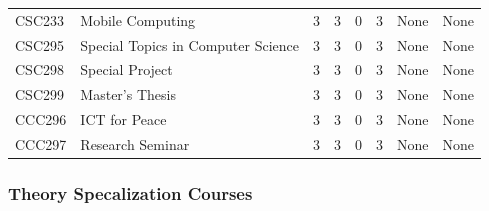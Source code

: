 \documentclass[11pt,a4paper]{article}
\begin{document}
{\begin{tabular}{p{.65in}L{2in}ccccp{.65in}p{.65in}}
CSC233 & Mobile Computing                      & 3          & 3   &  0  &  3    & None & None \\
CSC295 & Special Topics in Computer Science    & 3          & 3   &  0  &  3    & None & None \\
CSC298 & Special Project                       & 3          & 3   &  0  &  3    & None & None \\
CSC299 & Master's Thesis                       & 3          & 3   &  0  &  3    & None & None \\
CCC296 & ICT for Peace                         & 3          & 3   &  0  &  3    & None & None \\
CCC297 & Research Seminar                      & 3          & 3   &  0  &  3    & None & None \\

\hline
\end{tabular}
}

\subsubsection*{Theory Specalization Courses}
\end{document}
